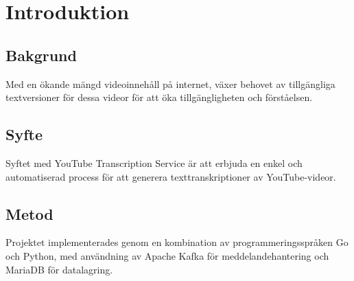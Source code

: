 \chapter{Introduktion}

\section{Bakgrund}
Med en ökande mängd videoinnehåll på internet, växer behovet av tillgängliga textversioner för dessa videor för att öka tillgängligheten och förståelsen.

\section{Syfte}
Syftet med YouTube Transcription Service är att erbjuda en enkel och automatiserad process för att generera texttranskriptioner av YouTube-videor.

\section{Metod}
Projektet implementerades genom en kombination av programmeringsspråken Go och Python, med användning av Apache Kafka för meddelandehantering och MariaDB för datalagring.
